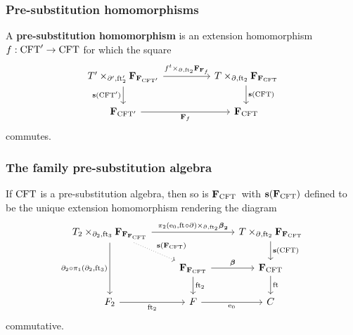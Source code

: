 \documentclass[handout]{beamer}
\newcommand\important[1]{\textbf{\color{red!90!black}#1}}
\begin{document}
\begin{frame}
\frametitle{\bf Pre-substitution homomorphisms}
A \important{pre-substitution homomorphism} is an extension homomorphism $f:\mathrm{CFT}'\to \mathrm{CFT}$
for which the square
\begin{equation*}
\begin{tikzcd}[ampersand replacement=\&,column sep=huge]
\cobesys{\stesyst'}{\famesys{\famesys{\stesys'}}}{\ebd'}{\eft[2]'}
  \ar{r}{\pullback{f^t}{\famehom{\famehom{f}}}{\ebd}{\eft[2]}}
  \ar{d}[swap]{\mathbf{s}(\stesys')}
  \&
\cobesys{\stesyst}{\famesys{\famesys{\stesys}}}{\ebd}{\eft[2]}
  \ar{d}{\mathbf{s}(\stesys)}
  \\
\famesys{\stesys'}
  \ar{r}[swap]{\famehom{f}}
  \&
\famesys{\stesys}
\end{tikzcd}
\end{equation*}
commutes.
\end{frame}

\begin{frame}
\frametitle{\bf The family pre-substitution algebra}
\begin{theorem}
If $\mathrm{CFT}$ is a pre-substitution algebra, then so is $\mathbf{F}_{\mathrm{CFT}}$\pause~with
$\mathbf{s}(\mathbf{F}_{\mathrm{CFT}})$ defined to be the unique extension homomorphism
rendering the diagram
\begin{equation*}
\begin{tikzcd}[ampersand replacement=\&]
\cobesys{\stesyst_2}{\famesys{\famesys{\famesys{\stesys}}}}{\ebd[2]}{\eft[3]}
  \ar[dotted]{dr}{\mathbf{s}(\famesys{\stesys})}
  \ar{rr}{\pullback{\pullbackpr{2}{\ectxext}{\eft\circ\ebd}}{\boldsymbol{\beta}_\mathbf{2}}{\ebd}{\eft[2]}}
  \ar{dd}[swap]{\ebd[2]\circ\pullbackpr{1}{\ebd[2]}{\eft[3]}}
  \&
  {}\&
\cobesys{\stesyst}{\famesys{\famesys{\stesys}}}{\ebd}{\eft[2]}
  \ar{d}{\mathbf{s}(\stesys)}
  \\
  {}\&
\famesys{\famesys{\stesys}}
  \ar{r}{\boldsymbol{\beta}}
  \ar{d}{\eft[2]}
  \&
\famesys{\stesys}
  \ar{d}{\eft}
  \\
\stesysf_2
  \ar{r}[swap]{\eft[2]}
  \&
\stesysf
  \ar{r}[swap]{\ectxext}
  \&
\stesysc
\end{tikzcd}
\end{equation*}
commutative.
\end{theorem}
\end{frame}
\end{document}

